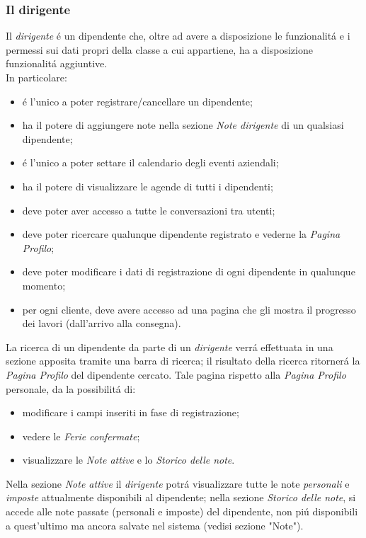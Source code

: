 \documentclass[paper=a4, fontsize=11pt]{scrartcl} %
\numberwithin{equation}{section} %
\numberwithin{figure}{section} %
\numberwithin{table}{section} %
\begin{document}
\subsubsection{Il dirigente}
Il \textit{dirigente} \'e un dipendente che, oltre ad avere a disposizione le funzionalit\'a e i permessi sui dati
propri della classe a cui appartiene, ha a disposizione funzionalit\'a aggiuntive.\\
In particolare:
\begin{itemize}
    \item \'e l'unico a poter registrare/cancellare un dipendente;
    \item ha il potere di aggiungere note nella sezione \textit{Note dirigente} di un qualsiasi dipendente;
    \item \'e l'unico a poter settare il calendario degli eventi aziendali;
    \item ha il potere di visualizzare le agende di tutti i dipendenti;
    \item deve poter aver accesso a tutte le conversazioni tra utenti;
    \item deve poter ricercare qualunque dipendente registrato e vederne la \textit{Pagina Profilo};
    \item deve poter modificare i dati di registrazione di ogni dipendente in qualunque momento;
    \item per ogni cliente, deve avere accesso ad una pagina che gli mostra il progresso dei lavori (dall'arrivo alla consegna).
\end{itemize}

La ricerca di un dipendente da parte di un \textit{dirigente} verr\'a effettuata in una sezione apposita tramite una
barra di ricerca; il risultato della ricerca ritorner\'a la \textit{Pagina Profilo} del dipendente cercato.
Tale pagina rispetto alla \textit{Pagina Profilo} personale, da la possibilit\'a di:
\begin{itemize}
 \item modificare i campi inseriti in fase di registrazione;
 \item vedere le \textit{Ferie confermate};
 \item visualizzare le \textit{Note attive} e  lo \textit{Storico delle note}.
\end{itemize}

Nella sezione \textit{Note attive} il \textit{dirigente} potr\'a visualizzare tutte
le note \textit{personali} e \textit{imposte} attualmente disponibili al dipendente; nella sezione
\textit{Storico delle note}, si accede alle note passate (personali e imposte) del dipendente, non pi\'u disponibili
a quest'ultimo ma ancora salvate nel sistema (vedisi sezione "Note").
\end{document}
